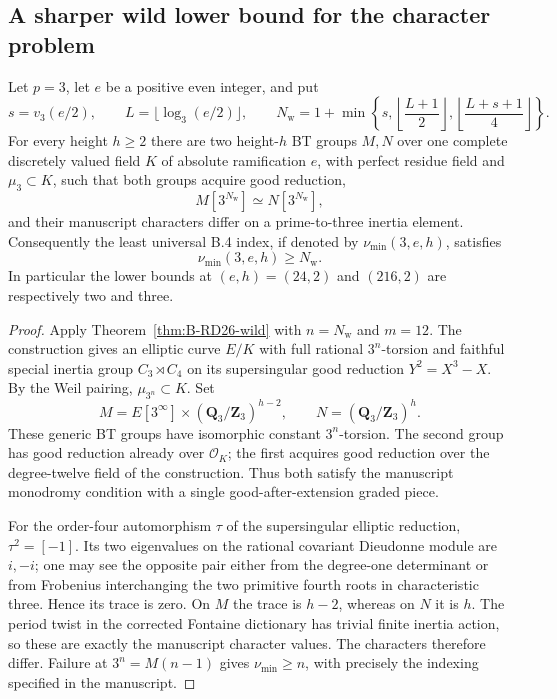 \subsection{A sharper wild lower bound for the character problem}

\begin{proposition}
\label{prop:B-RD28-wild-character}
Let $p=3$, let $e$ be a positive even integer, and put
\[
 s=v_3(e/2),\qquad L=\lfloor\log_3(e/2)\rfloor,\qquad
 N_{\mathrm w}=1+\min\left\{s,
     \left\lfloor\frac{L+1}{2}\right\rfloor,
     \left\lfloor\frac{L+s+1}{4}\right\rfloor\right\}.
\]
For every height $h\geq2$ there are two height-$h$ BT groups
$M,N$ over one complete discretely valued field $K$ of absolute
ramification $e$, with perfect residue field and $\mu_3\subset K$,
such that both groups acquire good reduction,
\[
                 M[3^{N_{\mathrm w}}]\simeq
                 N[3^{N_{\mathrm w}}],
\]
and their manuscript characters differ on a prime-to-three
inertia element. Consequently the least universal B.4 index,
if denoted by $\nu_{\min}(3,e,h)$, satisfies
\[
                       \nu_{\min}(3,e,h)\geq N_{\mathrm w}.
                                                        \tag{B-RD28.1}
\]
In particular the lower bounds at $(e,h)=(24,2)$ and $(216,2)$
are respectively two and three.
\end{proposition}

\begin{proof}
Apply Theorem~\ref{thm:B-RD26-wild} with $n=N_{\mathrm w}$ and
$m=12$. The construction gives an elliptic curve $E/K$ with
full rational $3^n$-torsion and faithful special inertia group
$C_3\rtimes C_4$ on its supersingular good reduction
$Y^2=X^3-X$. By the Weil pairing, $\mu_{3^n}\subset K$.
Set
\[
 M=E[3^\infty]\times(\mathbf Q_3/\mathbf Z_3)^{h-2},
 \qquad N=(\mathbf Q_3/\mathbf Z_3)^h.
\]
These generic BT groups have isomorphic constant $3^n$-torsion.
The second group has good reduction already over $\mathcal O_K$;
the first acquires good reduction over the degree-twelve field
of the construction. Thus both satisfy the manuscript monodromy
condition with a single good-after-extension graded piece.

For the order-four automorphism $\tau$ of the supersingular
elliptic reduction, $\tau^2=[-1]$. Its two eigenvalues on the
rational covariant Dieudonne module are $i,-i$; one may see the
opposite pair either from the degree-one determinant or from
Frobenius interchanging the two primitive fourth roots in
characteristic three. Hence its trace is zero. On $M$ the trace
is $h-2$, whereas on $N$ it is $h$. The period twist in the
corrected Fontaine dictionary has trivial finite inertia action,
so these are exactly the manuscript character values.
The characters therefore differ. Failure at
$3^n=M(n-1)$ gives $\nu_{\min}\geq n$, with precisely the indexing
specified in the manuscript.
\end{proof}

